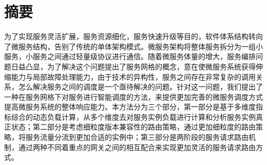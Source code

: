 \section*{摘要}
为了实现服务灵活扩展，服务资源细化，服务快速升级等目的，软件体系结构转向了微服务结构，告别了传统的单体架构模式。微服务架构将整体服务拆分为一组小服务，小服务之间通过轻量级协议进行通信。随着微服务体量的增大，服务编排问题日益凸显，为了解决这个问题提出了服务网格的概念，意在使微服务系统获得伸缩能力与局部故障处理能力，由于技术的异构性，服务之间存在非常复杂的调用关系，怎么解决服务之间的调度是一个亟待解决的问题。针对这一问题，我们提出了一种在服务网格下对服务进行智能调度的方法，来提供更加完善的微服务调度方式提高微服务系统的整体响应能力。本方法分为三个部分，第一部分是基于多维度指标综合的动态负载计算，从多个维度去对服务实例负载进行计算和分析服务实例真正状态；第二部分是考虑细粒度版本兼容性的路由策略，通过更加细粒度的路由策略，将服务流量分流到更加合适的实例中；第三部分是两阶段的服务请求路由机制，通过两种不同着重点的网关之间的相互配合来实现更加灵活的服务请求路由方式。
\newpage